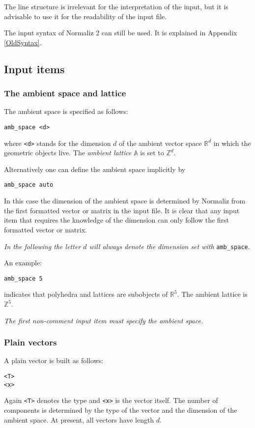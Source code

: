 \documentclass[12pt,a4paper]{scrartcl}
\theoremstyle{definition}
\def\ZZ{{\mathbb Z}}
\def\RR{{\mathbb R}}
\def\AA{{\mathbb A}}
\def\ttt{\texttt}
\begin{document}
The line structure is irrelevant for the interpretation of the input, but it is advisable to use it for the readability of the input file.

The input syntax of Normaliz 2 can still be used. It is explained in Appendix \ref{OldSyntax}.

\subsection{Input items}

\subsubsection{The ambient space and lattice}

The ambient space is specified as follows:
\begin{Verbatim}
amb_space <d>
\end{Verbatim}
where \ttt{<d>} stands for the dimension $d$ of the ambient vector space $\RR^d$ in which the geometric objects live.  The \emph{ambient lattice} $\AA$ is set to $\ZZ^d$.

Alternatively one can define the ambient space implicitly by
\begin{Verbatim}
amb_space auto
\end{Verbatim}
In this case the dimension of the ambient space is determined by Normaliz from the first formatted vector or matrix in the input file. It is clear that any input item that requires the knowledge of the dimension can only follow the first formatted vector or matrix.

\emph{In the following the letter $d$ will always denote the dimension set with} \verb|amb_space|.


An example:
\begin{Verbatim}
amb_space 5
\end{Verbatim}
indicates that polyhedra and lattices are subobjects of $\RR^5$. The ambient lattice is $\ZZ^5$. 

\emph{The first non-comment input item must specify the ambient space.}

\subsubsection{Plain vectors}

A plain vector is built as follows:
\begin{Verbatim}
<T>
<x>
\end{Verbatim}
Again \ttt{<T>} denotes the type and \ttt{<x>} is the vector itself. The number of components is determined by the type of the vector and the dimension of the ambient space. At present, all vectors have length $d$.
\end{document}
